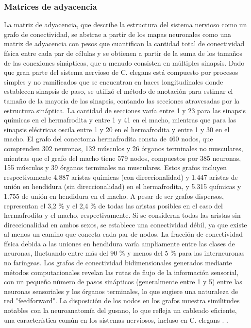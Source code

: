 \begin{figure}[h!]
\end{figure}


\subsubsection{Matrices de adyacencia}


La matriz de adyacencia, que describe la estructura del sistema nervioso como un grafo de conectividad, se abstrae a partir de los mapas neuronales como una matriz de adyacencia con pesos que cuantifican la cantidad total de conectividad física entre cada par de células y se obtienen a partir de la suma de los tamaños de las conexiones sinápticas, que a menudo consisten en múltiples sinapsis. Dado que gran parte del sistema nervioso de C. elegans está compuesto por procesos simples y no ramificados que se encuentran en haces longitudinales donde establecen sinapsis de paso, se utilizó el método de anotación para estimar el tamaño de la mayoría de las sinapsis, contando las secciones atravesadas por la estructura sináptica. La cantidad de secciones varía entre 1 y 23 para las sinapsis químicas en el hermafrodita y entre 1 y 41 en el macho, mientras que para las sinapsis eléctricas oscila entre 1 y 20 en el hermafrodita y entre 1 y 30 en el macho. El grafo del conectoma hermafrodita consta de 460 nodos, que comprenden 302 neuronas, 132 músculos y 26 órganos terminales no musculares, mientras que el grafo del macho tiene 579 nodos, compuestos por 385 neuronas, 155 músculos y 39 órganos terminales no musculares. Estos grafos incluyen respectivamente 4.887 aristas químicas (con direccionalidad) y 1.447 aristas de unión en hendidura (sin direccionalidad) en el hermafrodita, y 5.315 químicas y 1.755 de unión en hendidura en el macho. A pesar de ser grafos dispersos, representan el 3,2 \% y el 2,4 \% de todas las aristas posibles en el caso del hermafrodita y el macho, respectivamente. Si se consideran todas las aristas sin direccionalidad en ambos sexos, se establece una conectividad débil, ya que existe al menos un camino que conecta cada par de nodos. La fracción de conectividad física debida a las uniones en hendidura varía ampliamente entre las clases de neuronas, fluctuando entre más del 90 \% y menos del 5 \% para las interneuronas no faríngeas. Los grafos de conectividad bidimensionales generados mediante métodos computacionales revelan las rutas de flujo de la información sensorial, con un pequeño número de pasos sinápticos (generalmente entre 1 y 5) entre las neuronas sensoriales y los órganos terminales, lo que sugiere una naturaleza de red "feedforward". La disposición de los nodos en los grafos muestra similitudes notables con la neuroanatomía del gusano, lo que refleja un cableado eficiente, una característica común en los sistemas nerviosos, incluso en C. elegans \cite{cook_whole-animal_2019}. .



